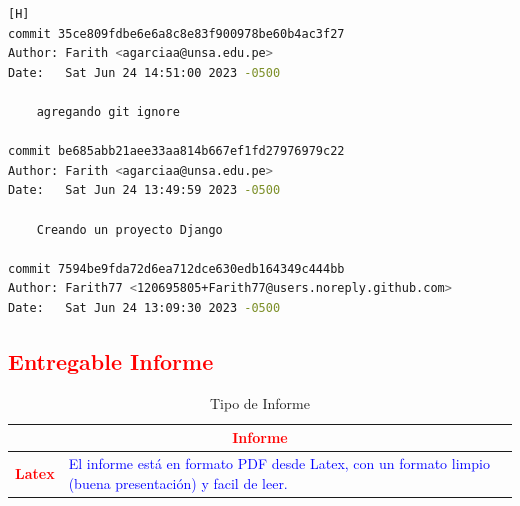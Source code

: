 \documentclass{article}
\begin{document}
\begin{lstlisting}[language=bash,caption={Todos los commit hechos para el laboratorio 6}][H]
commit 35ce809fdbe6e6a8c8e83f900978be60b4ac3f27
Author: Farith <agarciaa@unsa.edu.pe>
Date:   Sat Jun 24 14:51:00 2023 -0500

    agregando git ignore

commit be685abb21aee33aa814b667ef1fd27976979c22
Author: Farith <agarciaa@unsa.edu.pe>
Date:   Sat Jun 24 13:49:59 2023 -0500

    Creando un proyecto Django

commit 7594be9fda72d6ea712dce630edb164349c444bb
Author: Farith77 <120695805+Farith77@users.noreply.github.com>
Date:   Sat Jun 24 13:09:30 2023 -0500

     \end{lstlisting}
	
	\subsection{\textcolor{red}{Entregable Informe}}
	\begin{table}[H]
		\caption{Tipo de Informe}
		\setlength{\tabcolsep}{0.5em} %
		{\renewcommand{\arraystretch}{1.5}%
		\begin{tabular}{|p{3cm}|p{12cm}|}
			\hline
			\multicolumn{2}{|c|}{\textbf{\textcolor{red}{Informe}}}  \\
			\hline 
			\textbf{\textcolor{red}{Latex}} & \textcolor{blue}{El informe está en formato PDF desde Latex,  con un formato limpio (buena presentación) y facil de leer.}   \\ 
			\hline 
			
			
		\end{tabular}
	}
	\end{table}
 
			
\end{document}
